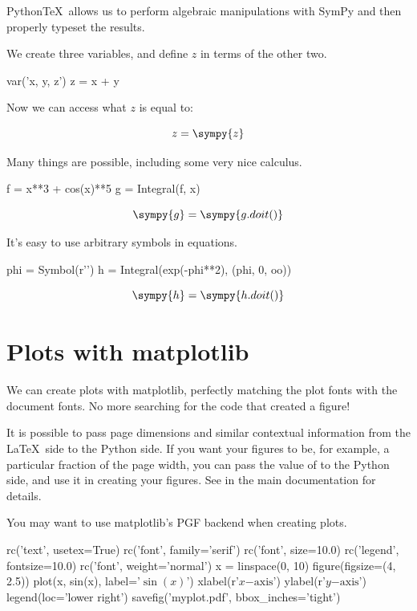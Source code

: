 \documentclass[11pt]{article}
\newcommand{\pytex}{Python\TeX}
\begin{document}
\pytex\ allows us to perform algebraic manipulations with SymPy and then properly typeset the results.

We create three variables, and define $z$ in terms of the other two.

\begin{sympyblock}
var('x, y, z')
z = x + y
\end{sympyblock}

Now we can access what $z$ is equal to:

\[z=\sympy{z}\]

Many things are possible, including some very nice calculus.

\begin{sympyblock}
f = x**3 + cos(x)**5
g = Integral(f, x)
\end{sympyblock}

\[\sympy{g}=\sympy{g.doit()}\]

It's easy to use arbitrary symbols in equations.

\begin{sympyblock}
phi = Symbol(r'\phi')
h = Integral(exp(-phi**2), (phi, 0, oo))
\end{sympyblock}

\[\sympy{h}=\sympy{h.doit()}\]



\section{Plots with matplotlib}

We can create plots with matplotlib, perfectly matching the plot fonts with the document fonts.  No more searching for the code that created a figure!

It is possible to pass page dimensions and similar contextual information from the \LaTeX\ side to the Python side.  If you want your figures to be, for example, a particular fraction of the page width, you can pass the value of  to the Python side, and use it in creating your figures.  See  in the main documentation for details.

You may want to use matplotlib's PGF backend when creating plots.

\begin{pylabblock}
rc('text', usetex=True)
rc('font', family='serif')
rc('font', size=10.0)
rc('legend', fontsize=10.0)
rc('font', weight='normal')
x = linspace(0, 10)
figure(figsize=(4, 2.5))
plot(x, sin(x), label='$\sin(x)$')
xlabel(r'$x\mathrm{-axis}$')
ylabel(r'$y\mathrm{-axis}$')
legend(loc='lower right')
savefig('myplot.pdf', bbox_inches='tight')
\end{pylabblock}
\end{document}
